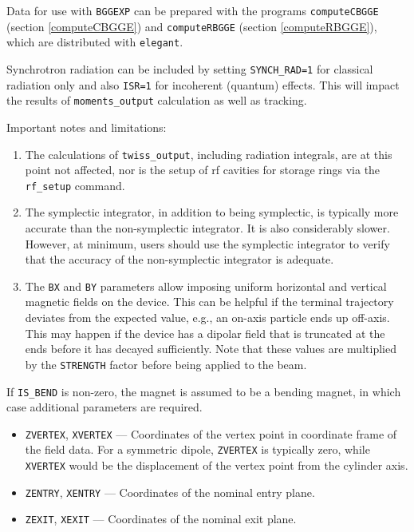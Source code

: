 Data for use with \verb|BGGEXP| can be prepared with the programs \verb|computeCBGGE| (section \ref{computeCBGGE})
and \verb|computeRBGGE| (section \ref{computeRBGGE}),
which are distributed with \verb|elegant|.

Synchrotron radiation can be included by setting \verb|SYNCH_RAD=1| for classical radiation only and
also \verb|ISR=1| for incoherent (quantum) effects. 
This will impact the results of \verb|moments_output| calculation as well as tracking.

Important notes and limitations:
\begin{enumerate}
\item The calculations of \verb|twiss_output|, including radiation integrals, are at this point not affected,
nor is the setup of rf cavities for storage rings via the \verb|rf_setup| command.
\item The symplectic integrator, in addition to being symplectic, is typically more accurate than the non-symplectic integrator.
  It is also considerably slower.
  However, at minimum, users should use the symplectic integrator to verify that the accuracy of the non-symplectic integrator
  is adequate.
\item The \verb|BX| and \verb|BY| parameters allow imposing uniform horizontal and vertical magnetic fields 
  on the device.
  This can be helpful if the terminal trajectory deviates from the expected value, e.g., an on-axis particle  
  ends up off-axis. This may happen if the device has
  a dipolar field that is truncated at the ends before it has decayed sufficiently.
  Note that these values are multiplied by the \verb|STRENGTH| factor before being applied to the beam.
\end{enumerate}

If \verb|IS_BEND| is non-zero, the magnet is assumed to be a bending magnet, in which case additional
parameters are required.
\begin{itemize}
\item \verb|ZVERTEX|, \verb|XVERTEX| --- Coordinates of the vertex point in coordinate frame of the field data.
  For a symmetric dipole, \verb|ZVERTEX| is typically zero, while \verb|XVERTEX| would be the displacement of
  the vertex point from the cylinder axis.
\item \verb|ZENTRY|, \verb|XENTRY| --- Coordinates of the nominal entry plane.
\item \verb|ZEXIT|, \verb|XEXIT| --- Coordinates of the nominal exit plane.
\end{itemize}
